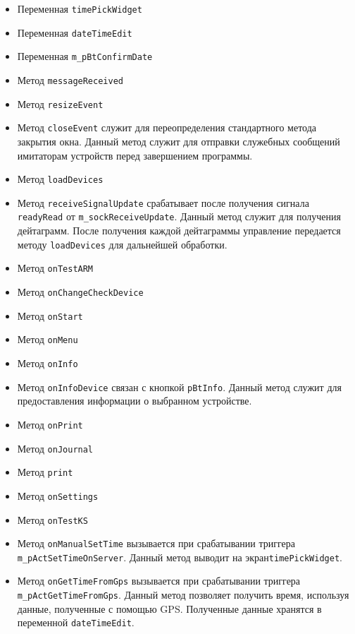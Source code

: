 \begin{itemize}
	\item Переменная \texttt{timePickWidget}
	\item Переменная \texttt{dateTimeEdit}
	\item Переменная \texttt{m\_pBtConfirmDate}

	\item Метод \texttt{messageReceived}
	\item Метод \texttt{resizeEvent}
	\item Метод \texttt{closeEvent} служит для переопределения стандартного метода закрытия окна. Данный метод
		служит для отправки служебных сообщений имитаторам устройств перед завершением программы.

	\item Метод \texttt{loadDevices}
	\item Метод \texttt{receiveSignalUpdate} срабатывает после получения сигнала \texttt{readyRead} от
		\texttt{m\_sockReceiveUpdate}. Данный метод служит для получения дейтаграмм. После получения каждой
		дейтаграммы управление передается методу \texttt{loadDevices} для дальнейшей обработки.

	\item Метод \texttt{onTestARM}

	\item Метод \texttt{onChangeCheckDevice}
	\item Метод \texttt{onStart}
	\item Метод \texttt{onMenu}
	\item Метод \texttt{onInfo}
	\item Метод \texttt{onInfoDevice} связан с кнопкой \texttt{pBtInfo}. Данный метод служит для предоставления
		информации о выбранном устройстве.

	\item Метод \texttt{onPrint}
	\item Метод \texttt{onJournal}
	\item Метод \texttt{print}
	\item Метод \texttt{onSettings}
	\item Метод \texttt{onTestKS}
	\item Метод \texttt{onManualSetTime} вызывается при срабатывании триггера \texttt{m\_pActSetTimeOnServer}.
		Данный метод выводит на экран\break \texttt{timePickWidget}.

	\item Метод \texttt{onGetTimeFromGps} вызывается при срабатывании триггера \texttt{m\_pActGetTimeFromGps}.
		Данный метод позволяет получить время, используя данные, полученные с помощью GPS. Полученные данные
		хранятся в переменной \texttt{dateTimeEdit}.


\end{itemize}
